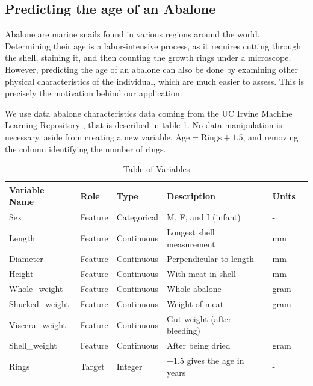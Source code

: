 \documentclass[a4paper,11pt]{article}
\begin{document}
\subsection{Predicting the age of an Abalone}

Abalone are marine snails found in various regions around the world. Determining their age is a labor-intensive process, as it requires cutting through the shell, staining it, and then counting the growth rings under a microscope. However, predicting the age of an abalone can also be done by examining other physical characteristics of the individual, which are much easier to assess. This is precisely the motivation behind our application.

We use data abalone characteristics data coming from the UC Irvine Machine Learning Repository \parencite{warwicknashAbalone1994a}, that is described in table \ref{table1}. No data manipulation is necessary, aside from creating a new variable, \( \text{Age} = \text{Rings} + 1.5 \), and removing the column identifying the number of rings.

\begin{table}[]
  \centering
  \begin{tabular}{llllll}

  \toprule
  Variable Name & Role & Type & Description & Units \\
  \midrule
  Sex                  & Feature       & Categorical   & M, F, and I (infant) & -    \\
  Length               & Feature       & Continuous    & Longest shell measurement & mm\\
  Diameter             & Feature       & Continuous    & Perpendicular to length & mm  \\
  Height               & Feature       & Continuous    & With meat in shell      & mm  \\
  Whole\_weight         & Feature       & Continuous    & Whole abalone           & gram\\
  Shucked\_weight       & Feature       & Continuous    & Weight of meat          & gram\\
  Viscera\_weight       & Feature       & Continuous    & Gut weight (after bleeding) & \\
  Shell\_weight         & Feature       & Continuous    & After being dried       & gram\\
  Rings                & Target        & Integer       & +1.5 gives the age in years & - \\

   \bottomrule
  \end{tabular}
  \caption{Table of Variables}
  \label{table1}
  \end{table}
\end{document}
